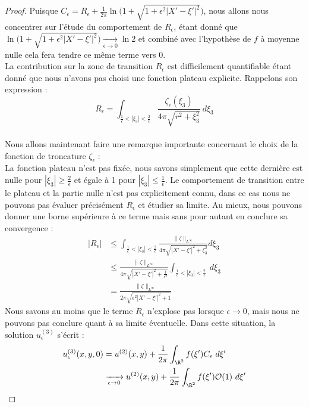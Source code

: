 \begin{proof}
Puisque $C_{\epsilon} = R_{\epsilon} + \frac{1}{2\pi} \ln \big(1 + \sqrt{1 + \epsilon^2 |X' - \xi'|^2} \big) $, nous allons nous concentrer sur l'étude du comportement de $R_{\epsilon}$, étant donné que $\ln \big(1 + \sqrt{1 + \epsilon^2 |X' - \xi'|^2}\big) \xrightarrow[\epsilon \to 0]{} \ln 2 $ et combiné avec l'hypothèse de $f$ à moyenne nulle cela fera tendre ce même terme vers 0. \\
La contribution sur la zone de transition $R_{\epsilon}$ est difficilement quantifiable étant donné que nous n'avons pas choisi une fonction plateau explicite. Rappelons son expression : 
$$ R_{\epsilon} = \int_{\frac{1}{\epsilon} < |\xi_3| < \frac{2}{\epsilon} } \frac{\zeta_{\epsilon}(\xi_3)}{4\pi \sqrt{r^2 + \xi_3^2}} \ d\xi_3 $$
\\
Nous allons maintenant faire une remarque importante concernant le choix de la fonction de troncature $\zeta_{\epsilon}$ :\\
La fonction plateau n'est pas fixée, nous savons simplement que cette dernière est nulle pour $|\xi_3| \geq \frac{2}{\epsilon}$ et égale à 1 pour $|\xi_3| \leq \frac{1}{\epsilon} $. Le comportement de transition entre le plateau et la partie nulle n'est pas explicitement connu, dans ce cas
nous ne pouvons pas évaluer précisément $R_{\epsilon}$ et étudier sa limite. Au mieux, nous pouvons donner une borne supérieure à ce terme mais sans pour autant en conclure sa convergence :
\begin{align*}
    |R_{\epsilon}| &\leq \int_{\frac{1}{\epsilon}<|\xi_3| < \frac{2}{\epsilon}} \frac{\|\zeta\|_{L^{\infty}}}{4\pi \sqrt{|X' - \xi'|^2 + \xi_3^2}} d\xi_3 \\
    &\leq \frac{\|\zeta\|_{L^{\infty}}}{4\pi \sqrt{|X' - \xi'|^2 + \frac{1}{\epsilon^2}}}  \int_{\frac{1}{\epsilon}<|\xi_3| < \frac{2}{\epsilon}} \ d\xi_3 \\
    &= \frac{\|\zeta\|_{L^{\infty}}}{2\pi \sqrt{\epsilon^2 |X' - \xi'|^2 + 1}}
\end{align*}
Nous savons au moins que le terme $R_{\epsilon}$ n'explose pas lorsque $\epsilon \to 0$,
mais nous ne pouvons pas conclure quant à sa limite éventuelle. Dans cette situation, la solution $u^{(3)}_{\epsilon}$ s'écrit :
\begin{align*}
    u_{\epsilon}^{(3)}(x,y,0) &= u^{(2)}(x,y) + \frac{1}{2\pi} \int_{\R^2} f(\xi') C_{\epsilon} \ d\xi' \\
    &\xrightarrow[\epsilon \to 0]{} u^{(2)}(x,y) + \frac{1}{2\pi} \int_{\R^2} f(\xi') \mathcal{O}(1) \ d\xi' 
\end{align*}

\end{proof}
